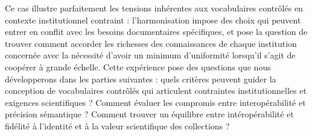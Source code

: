 Ce cas illustre parfaitement les tensions inhérentes aux vocabulaires contrôlés en contexte institutionnel contraint : l'harmonisation impose des choix qui peuvent entrer en conflit avec les besoins documentaires spécifiques, et pose la question de trouver comment accorder les richesses des connaissances de chaque institution concernée avec la nécessité d'avoir un minimum d'uniformité lorsqu'il s'agit de coopérer à grande échelle. Cette expérience pose des questions que nous développerons dans les parties suivantes : quels critères peuvent guider la conception de vocabulaires contrôlés qui articulent contraintes institutionnelles et exigences scientifiques ? Comment évaluer les compromis entre interopérabilité et précision sémantique ? Comment trouver un équilibre entre intéropérabilité et fidélité à l'identité et à la valeur scientifique des collections ?